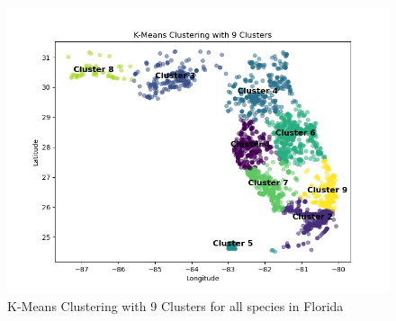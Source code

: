 \documentclass{article}
\begin{document}
\begin{figure}[H]
    \centering
    \begin{minipage}{0.9\textwidth}
        \centering
        \includegraphics[width=\textwidth]{figures/ninecluster.png}
        \caption{K-Means Clustering with 9 Clusters for all species in Florida}
        \label{fig:kmeansclust}
    \end{minipage}
\end{figure}
\end{document}
